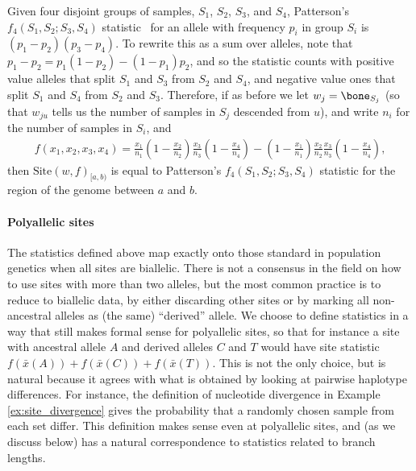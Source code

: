 \documentclass{article}
\newcommand{\site}{\mbox{Site}} %
\newcommand{\iw}{w} %
\newcommand{\aw}{{\bar x}} %
\begin{document}
\begin{example}[Patterson's $f_4$] \label{ex:site_f4}
    Given four disjoint groups of samples, $S_1$, $S_2$, $S_3$, and $S_4$,
    Patterson's $f_4(S_1, S_2; S_3, S_4)$
    statistic~\citep{reich2009reconstructing,patterson2012ancient}
    for an allele with frequency $p_i$ in group $S_i$
    is $(p_1 - p_2)(p_3 - p_4)$. To rewrite this as a sum over alleles, note that
    $p_1 - p_2 = p_1 (1 - p_2) - (1 - p_1) p_2$,
    and so the statistic counts with positive value
    alleles that split $S_1$ and $S_3$ from $S_2$ and $S_4$,
    and negative value ones that split $S_1$ and $S_4$ from $S_2$ and $S_3$.
    Therefore, if as before we
    let $\iw_j = \bone_{S_j}$
    (so that $\iw_{ju}$ tells us the number of samples in $S_j$ descended from $u$),
    and write $n_i$ for the number of samples in $S_i$, and
    \begin{align*}
        f(x_1, x_2, x_3, x_4)
        =
        \frac{x_1}{n_1}
        \left(1 - \frac{x_2}{n_2}\right)
        \frac{x_3}{n_3}
        \left(1 - \frac{x_4}{n_4}\right)
        -
        \left(1 - \frac{x_1}{n_1}\right)
        \frac{x_2}{n_2}
        \frac{x_3}{n_3}
        \left(1 - \frac{x_4}{n_4}\right),
    \end{align*}
    then $\site(\iw, f)_{[a,b)}$ is equal to Patterson's $f_4(S_1, S_2; S_3, S_4)$ statistic
    for the region of the genome between $a$ and $b$.
\end{example}


\paragraph{Polyallelic sites}
The statistics defined above map exactly onto those standard in population genetics
when all sites are biallelic.
There is not a consensus in the field
on how to use sites with more than two alleles, but the most common practice is
to reduce to biallelic data, by either discarding other sites
or by marking all non-ancestral alleles as (the same) ``derived'' allele.
We choose to define statistics in a way that still makes formal sense for polyallelic sites,
so that for instance a site with ancestral allele $A$ and derived alleles $C$ and $T$
would have site statistic $f(\aw(A)) + f(\aw(C)) + f(\aw(T))$.
This is not the only choice, but is natural because it agrees with what is obtained by
looking at pairwise haplotype differences.
For instance, the definition of nucleotide divergence in Example \ref{ex:site_divergence}
gives the probability that a randomly chosen sample from each set differ.
This definition makes sense even at polyallelic sites,
and (as we discuss below) has a natural correspondence to statistics related to branch lengths.
\end{document}
